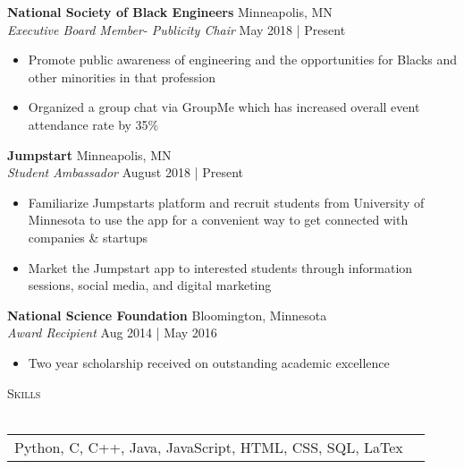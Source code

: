 \documentclass[a4paper]{article}
\newcommand{\lineunder} {
	\vspace*{-8pt} \\
	\hspace*{-18pt} \hrulefill \\
}
\newcommand{\header} [1] {
	{\hspace*{-18pt}\vspace*{6pt} \textsc{#1}}
	\vspace*{-6pt} \lineunder
}
\begin{document}
	\textbf{National Society of Black Engineers} \hfill Minneapolis, MN\\
	\textit{Executive Board Member- Publicity Chair} \hfill May 2018 | Present\\
	\vspace{-1mm}
	\begin{itemize} \itemsep 1pt
		\item Promote public awareness of engineering and the opportunities for Blacks and other minorities in that profession
		\item Organized a group chat via GroupMe which has increased overall event attendance rate by 35\%
	\end{itemize}
	\textbf{Jumpstart} \hfill Minneapolis, MN\\
	\textit{Student Ambassador} \hfill August 2018 | Present\\
	\vspace{-1mm}
	\begin{itemize} \itemsep 1pt
		\item Familiarize Jumpstart\textquotesingle{}s platform and recruit students from University of Minnesota to use the app for a convenient way to get connected with companies \& startups
		\item Market the Jumpstart app to interested students through information sessions, social media, and digital marketing
	\end{itemize}
	\vspace{-1mm}
	\textbf{National Science Foundation} \hfill Bloomington, Minnesota\\
	\textit{Award Recipient} \hfill Aug 2014 | May 2016\\
	\vspace{-1mm}
	\begin{itemize} \itemsep 1pt
		\item Two year scholarship received on outstanding academic excellence
	\end{itemize}
	
	\header{\large \scshape {Skills}}
	\begin{tabular}{ l l }
		Python, C, C++, Java, JavaScript, HTML, CSS, SQL, LaTex \\
	\end{tabular}
	\vspace{2mm}
	
	\ 
\end{document}
